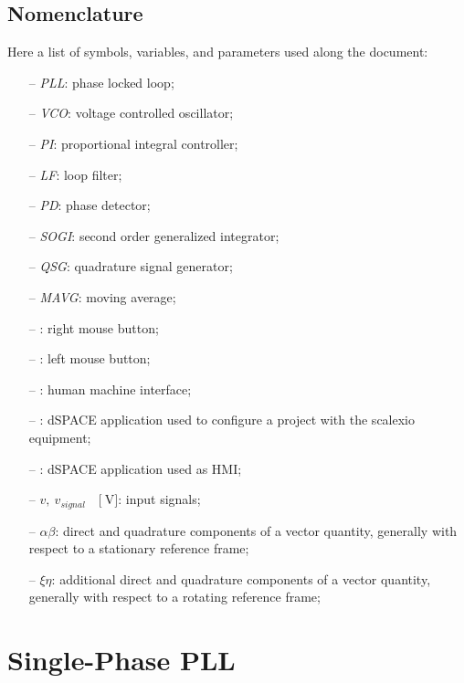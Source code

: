 \documentclass[11pt,a4paper,oneside]{book}
\numberwithin{equation}{section}
\theoremstyle{it}
\theoremstyle{definition}
\begin{document}
\section{Nomenclature}
Here a list of symbols, variables, and parameters used along the document: 
	\begin{itemize}
		\item[--] \textit{PLL}: phase locked loop;
		\item[--] \textit{VCO}: voltage controlled oscillator;		
		\item[--] \textit{PI}: proportional integral controller;
		\item[--] \textit{LF}: loop filter;
		\item[--] \textit{PD}: phase detector;		
		\item[--] \textit{SOGI}: second order generalized integrator;
		\item[--] \textit{QSG}: quadrature signal generator;
		\item[--] \textit{MAVG}: moving average;
		\item[--] : right mouse button;
		\item[--] : left mouse button;
		\item[--] : human machine interface;
		\item[--] : dSPACE application used to configure a project with the scalexio equipment;
		\item[--] : dSPACE application used as HMI;
		\item[--] $v,\ v_{signal}\quad\Big[\SI{}{\volt}\Big]$: input signals;		
		\item[--] $\alpha\beta$: direct and quadrature components of a vector quantity, generally with respect to a stationary reference frame;		
		\item[--] $\xi\eta$: additional direct and quadrature components of a vector quantity, generally with respect to a rotating reference frame;
	\end{itemize}

\chapter{Single-Phase PLL}	
\end{document}
